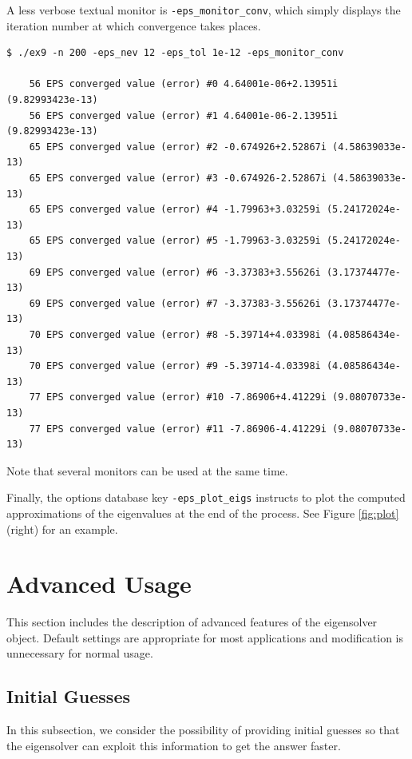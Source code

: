 	A less verbose textual monitor is \Verb!-eps_monitor_conv!, which simply displays the iteration number at which convergence takes places.
\begin{Verbatim}[fontsize=\footnotesize,numbers=none]
   $ ./ex9 -n 200 -eps_nev 12 -eps_tol 1e-12 -eps_monitor_conv

    56 EPS converged value (error) #0 4.64001e-06+2.13951i (9.82993423e-13)
    56 EPS converged value (error) #1 4.64001e-06-2.13951i (9.82993423e-13)
    65 EPS converged value (error) #2 -0.674926+2.52867i (4.58639033e-13)
    65 EPS converged value (error) #3 -0.674926-2.52867i (4.58639033e-13)
    65 EPS converged value (error) #4 -1.79963+3.03259i (5.24172024e-13)
    65 EPS converged value (error) #5 -1.79963-3.03259i (5.24172024e-13)
    69 EPS converged value (error) #6 -3.37383+3.55626i (3.17374477e-13)
    69 EPS converged value (error) #7 -3.37383-3.55626i (3.17374477e-13)
    70 EPS converged value (error) #8 -5.39714+4.03398i (4.08586434e-13)
    70 EPS converged value (error) #9 -5.39714-4.03398i (4.08586434e-13)
    77 EPS converged value (error) #10 -7.86906+4.41229i (9.08070733e-13)
    77 EPS converged value (error) #11 -7.86906-4.41229i (9.08070733e-13)
\end{Verbatim}

Note that several monitors can be used at the same time.

Finally, the options database key \Verb!-eps_plot_eigs! instructs \slepc to plot the computed approximations of the eigenvalues at the end of the process. See Figure \ref{fig:plot} (right) for an example.

\section{Advanced Usage}

	This section includes the description of advanced features of the eigensolver object. Default settings are appropriate for most applications and modification is unnecessary for normal usage.

\subsection{Initial Guesses}

	In this subsection, we consider the possibility of providing initial guesses so that the eigensolver can exploit this information to get the answer faster.

